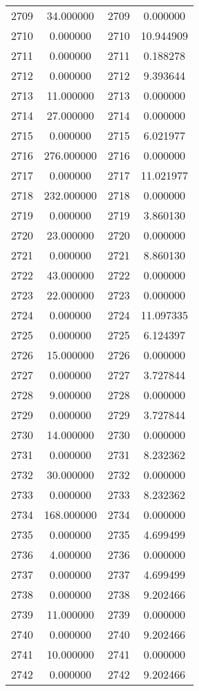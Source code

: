 \documentclass[12pt]{article}
\begin{document}
\begin{longtable}{@{}cccc@{}}
2709 & 34.000000 & 2709 & 0.000000 \\
2710 & 0.000000 & 2710 & 10.944909 \\
2711 & 0.000000 & 2711 & 0.188278 \\
2712 & 0.000000 & 2712 & 9.393644 \\
2713 & 11.000000 & 2713 & 0.000000 \\
2714 & 27.000000 & 2714 & 0.000000 \\
2715 & 0.000000 & 2715 & 6.021977 \\
2716 & 276.000000 & 2716 & 0.000000 \\
2717 & 0.000000 & 2717 & 11.021977 \\
2718 & 232.000000 & 2718 & 0.000000 \\
2719 & 0.000000 & 2719 & 3.860130 \\
2720 & 23.000000 & 2720 & 0.000000 \\
2721 & 0.000000 & 2721 & 8.860130 \\
2722 & 43.000000 & 2722 & 0.000000 \\
2723 & 22.000000 & 2723 & 0.000000 \\
2724 & 0.000000 & 2724 & 11.097335 \\
2725 & 0.000000 & 2725 & 6.124397 \\
2726 & 15.000000 & 2726 & 0.000000 \\
2727 & 0.000000 & 2727 & 3.727844 \\
2728 & 9.000000 & 2728 & 0.000000 \\
2729 & 0.000000 & 2729 & 3.727844 \\
2730 & 14.000000 & 2730 & 0.000000 \\
2731 & 0.000000 & 2731 & 8.232362 \\
2732 & 30.000000 & 2732 & 0.000000 \\
2733 & 0.000000 & 2733 & 8.232362 \\
2734 & 168.000000 & 2734 & 0.000000 \\
2735 & 0.000000 & 2735 & 4.699499 \\
2736 & 4.000000 & 2736 & 0.000000 \\
2737 & 0.000000 & 2737 & 4.699499 \\
2738 & 0.000000 & 2738 & 9.202466 \\
2739 & 11.000000 & 2739 & 0.000000 \\
2740 & 0.000000 & 2740 & 9.202466 \\
2741 & 10.000000 & 2741 & 0.000000 \\
2742 & 0.000000 & 2742 & 9.202466 \\

\end{longtable}
\end{document}
